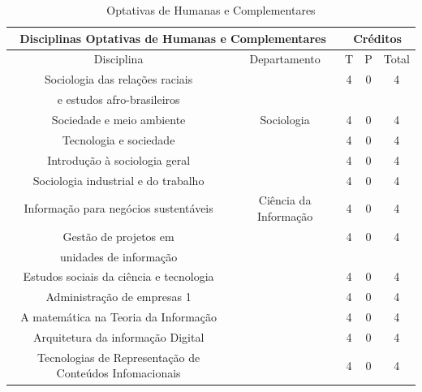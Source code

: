 \singlespacing


\begin{table}[H]
\caption{Optativas de Humanas e Complementares}
\centering
\begin{tabular}{|c|c|c|c|c|}
\hline
\hline
\multicolumn{2}{|c|}{\textbf{Disciplinas Optativas de Humanas e Complementares}}  &  \multicolumn{3}{|c|}{\textbf{Créditos}} \\
\hline
Disciplina & Departamento &  T   &  P   & Total \\
\hline
\hline 

Sociologia das relações raciais  &  & 4 & 0 & 4 \\
e estudos afro-brasileiros & & & & \\
Sociedade e meio ambiente & Sociologia & 4 & 0 & 4\\
Tecnologia e sociedade & & 4 & 0 & 4 \\
Introdução à sociologia geral &  & 4 & 0 & 4\\
Sociologia industrial e do trabalho &  & 4 & 0 & 4\\




\hline

Informação para negócios sustentáveis  & Ciência da Informação& 4 & 0 & 4\\

Gestão de projetos em   & & 4 & 0 & 4\\
unidades de informação & & & &\\

Estudos sociais da ciência e tecnologia  & & 4 & 0 & 4\\

Administração de empresas 1  & & 4 & 0 & 4\\

A matemática na Teoria da Informação   & & 4 & 0 & 4\\

Arquitetura da informação Digital    & & 4 & 0 & 4\\

Tecnologias de Representação de Conteúdos Infomacionais & & 4 & 0 & 4\\


\end{tabular}
\end{table}
